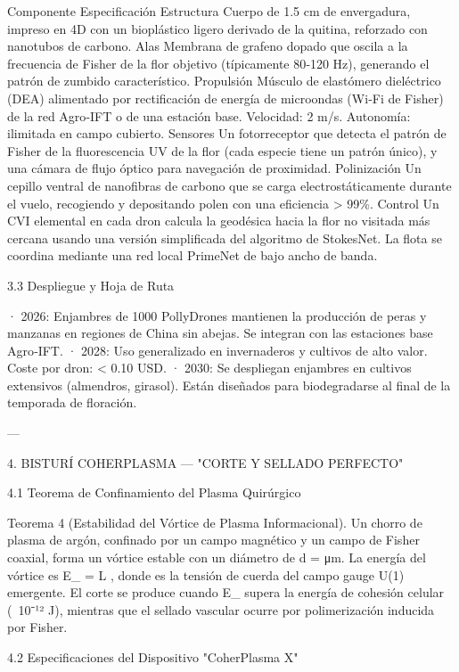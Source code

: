 \documentclass[12pt,twoside]{book}
\begin{document}
Componente Especificación
Estructura Cuerpo de 1.5 cm de envergadura, impreso en 4D con un bioplástico ligero derivado de la quitina, reforzado con nanotubos de carbono.
Alas Membrana de grafeno dopado que oscila a la frecuencia de Fisher de la flor objetivo (típicamente 80‑120 Hz), generando el patrón de zumbido característico.
Propulsión Músculo de elastómero dieléctrico (DEA) alimentado por rectificación de energía de microondas (Wi‑Fi de Fisher) de la red Agro‑IFT o de una estación base. Velocidad: 2 m/s. Autonomía: ilimitada en campo cubierto.
Sensores Un fotorreceptor que detecta el patrón de Fisher de la fluorescencia UV de la flor (cada especie tiene un patrón único), y una cámara de flujo óptico para navegación de proximidad.
Polinización Un cepillo ventral de nanofibras de carbono que se carga electrostáticamente durante el vuelo, recogiendo y depositando polen con una eficiencia > 99\%.
Control Un CVI elemental en cada dron calcula la geodésica hacia la flor no visitada más cercana usando una versión simplificada del algoritmo de StokesNet. La flota se coordina mediante una red local PrimeNet de bajo ancho de banda.

3.3 Despliegue y Hoja de Ruta

· 2026: Enjambres de 1000 PollyDrones mantienen la producción de peras y manzanas en regiones de China sin abejas. Se integran con las estaciones base Agro‑IFT.
· 2028: Uso generalizado en invernaderos y cultivos de alto valor. Coste por dron: < 0.10 USD.
· 2030: Se despliegan enjambres en cultivos extensivos (almendros, girasol). Están diseñados para biodegradarse al final de la temporada de floración.

---

4. BISTURÍ COHERPLASMA — "CORTE Y SELLADO PERFECTO"

4.1 Teorema de Confinamiento del Plasma Quirúrgico

Teorema 4 (Estabilidad del Vórtice de Plasma Informacional). Un chorro de plasma de argón, confinado por un campo magnético y un campo de Fisher coaxial, forma un vórtice estable con un diámetro de  d =    μm. La energía del vórtice es  E_{} = \sigma \cdot L , donde  \sigma  es la tensión de cuerda del campo gauge U(1) emergente. El corte se produce cuando  E_{}  supera la energía de cohesión celular (~10⁻¹² J), mientras que el sellado vascular ocurre por polimerización inducida por Fisher.

4.2 Especificaciones del Dispositivo "CoherPlasma X"
\end{document}

